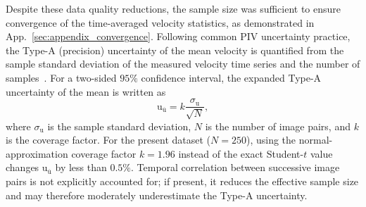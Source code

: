 \documentclass[wes, manuscript]{copernicus}
\begin{document}
Despite these data quality reductions, the sample size was sufficient to ensure convergence of the time-averaged velocity statistics, as demonstrated in App.~\ref{sec:appendix_convergence}. Following common PIV uncertainty practice, the Type-A (precision) uncertainty of the mean velocity is quantified from the sample standard deviation of the measured velocity time series and the number of samples~\citep{sciacchitano2016}. For a two-sided $95\%$ confidence interval, the expanded Type-A uncertainty of the mean is written as
\begin{equation}\label{eq:velocity_averaged_uncertainty}
\textrm{u}_{\overline{\textrm{u}}} = k \frac{\sigma_\textrm{u}}{\sqrt{N}},
\end{equation}
where $\sigma_\textrm{u}$ is the sample standard deviation, $N$ is the number of image pairs, and $k$ is the coverage factor. 
For the present dataset ($N=250$), using the normal-approximation coverage factor $k=1.96$ instead of the exact Student-$t$ value changes $\textrm{u}_{\overline{\textrm{u}}}$ by less than $0.5\%$. Temporal correlation between successive image pairs is not explicitly accounted for; if present, it reduces the effective sample size and may therefore moderately underestimate the Type-A uncertainty. 
\end{document}
